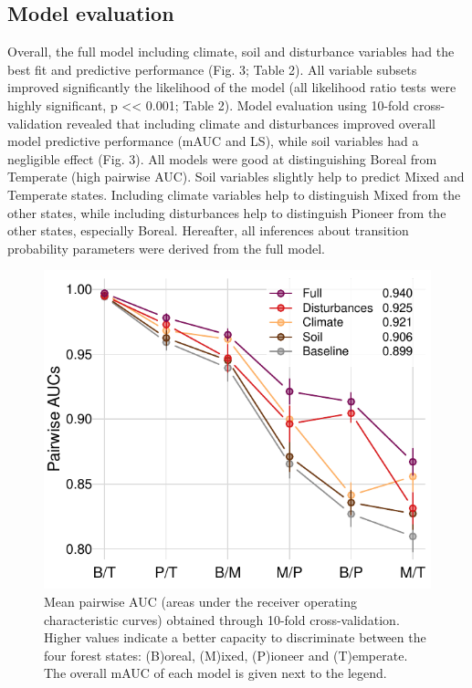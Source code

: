\documentclass[a4paperpaper,]{article}
\begin{document}
\hypertarget{model-evaluation}{%
\subsection{Model evaluation}\label{model-evaluation}}

Overall, the full model including climate, soil and disturbance
variables had the best fit and predictive performance (Fig. 3; Table 2).
All variable subsets improved significantly the likelihood of the model
(all likelihood ratio tests were highly significant, p
\textless{}\textless{} 0.001; Table 2). Model evaluation using 10-fold
cross-validation revealed that including climate and disturbances
improved overall model predictive performance (mAUC and LS), while soil
variables had a negligible effect (Fig. 3). All models were good at
distinguishing Boreal from Temperate (high pairwise AUC). Soil variables
slightly help to predict Mixed and Temperate states. Including climate
variables help to distinguish Mixed from the other states, while
including disturbances help to distinguish Pioneer from the other
states, especially Boreal. Hereafter, all inferences about transition
probability parameters were derived from the full model.

\begin{figure}
\centering
\includegraphics{res/fig3_cv_auc.pdf}
\caption{Mean pairwise AUC (areas under the receiver operating
characteristic curves) obtained through 10-fold cross-validation. Higher
values indicate a better capacity to discriminate between the four
forest states: (B)oreal, (M)ixed, (P)ioneer and (T)emperate. The overall
mAUC of each model is given next to the legend.}
\end{figure}
\end{document}
